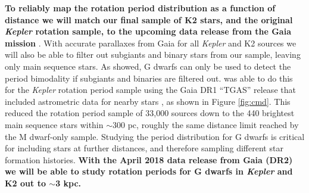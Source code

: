 \documentclass[12pt]{article}
\newcommand{\Kepler}{\textsl{Kepler}\xspace}
\begin{document}
{\bf To reliably map the rotation period distribution as a function of distance we will match our final sample of K2 stars, and the original \Kepler rotation sample, to the upcoming data release from the Gaia mission} \citep{perryman2001}. With accurate parallaxes from Gaia for all \Kepler and K2 sources we will also be able to filter out subgiants and binary stars from our sample, leaving only main sequence stars. As \citet{davenport2017} showed, G dwarfs can only be used to detect the period bimodality if subgiants and binaries are filtered out.\citet{davenport2017} was able to do this for the \Kepler rotation period sample using the Gaia DR1 ``TGAS'' release that included astrometric data for nearby stars \citep{gaia_dr1}, as shown in Figure \ref{fig:cmd}. This reduced the \citet{mcquillan2014} rotation period sample of 33,000 sources down to the 440 brightest main sequence stars within $\sim$300 pc, roughly the same distance limit reached by the M dwarf-only sample. Studying the period distribution for G dwarfs is critical for including stars at further distances, and therefore sampling different star formation histories. {\bf With the April 2018 data release from Gaia (DR2) we will be able to study rotation periods for G dwarfs in \Kepler and K2 out to $\sim$3 kpc.}
\end{document}
